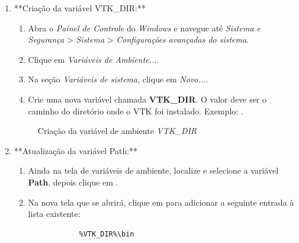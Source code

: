 \documentclass[a4paper,11pt]{article}
\newcommand{\windows}{\textit{Windows}}
\begin{document}
\begin{enumerate}
	\item **Criação da variável VTK\_DIR:**
	\begin{enumerate}
		\item Abra o \textit{Painel de Controle} do \windows{} e navegue até \textit{Sistema e Segurança} > \textit{Sistema} > \textit{Configurações avançadas do sistema}.
		\item Clique em \textit{Variáveis de Ambiente...}.
		\item Na seção \textit{Variáveis de sistema}, clique em \textit{Novo...}.
		\item Crie uma nova variável chamada \textbf{VTK\_DIR}. O valor deve ser o caminho do diretório onde o VTK foi instalado. Exemplo: .
	\end{enumerate}
	
	\begin{figure}[H]\centering
		\caption{Criação da variável de ambiente \emph{VTK\_DIR}}\label{fig:vtkdirenv}
	\end{figure}
	
	\item **Atualização da variável Path:**
	\begin{enumerate}
		\item Ainda na tela de variáveis de ambiente, localize e selecione a variável \textbf{Path}, depois clique em .
		\item Na nova tela que se abrirá, clique em  para adicionar a seguinte entrada à lista existente:
		\begin{mdframed}
		\begin{verbatim}
			%VTK_DIR%\bin
		\end{verbatim}
		\end{mdframed}
	\end{enumerate}
	

\end{enumerate}
\end{document}
